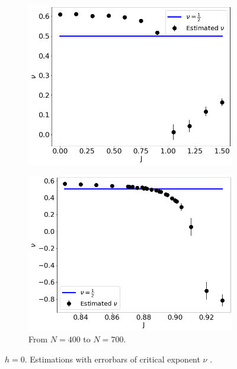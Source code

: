  \begin{figure}[H]
	\centering
	\captionsetup{justification=centering}
	\begin{subfigure}[b]{0.45\textwidth}
		\includegraphics[scale=0.36]{Images/3_nu_shortchains.png}
		\label{fig:nushort3D_short}
	\end{subfigure}
	\begin{subfigure}[b]{0.45\textwidth}
		\includegraphics[scale=0.36]{Images/3_nu_shortchains_deep.png}
		\caption{ From $N=400$ to $N=700$. }
		\label{fig:nushort3D_long}
	\end{subfigure}
	\caption{$h=0$. Estimations with errorbars of critical exponent $\nu$ .   }
	\label{fig:nushort3D}
\end{figure}
 

